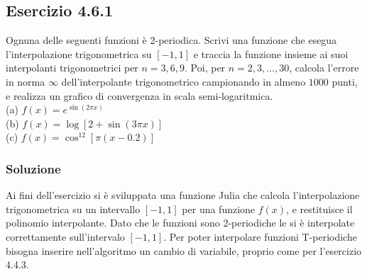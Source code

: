 \documentclass[letterpaper, 12pt]{article}
\begin{document}
\subsection{Esercizio 4.6.1} 
Ognuna delle seguenti funzioni è 2-periodica. Scrivi una funzione che esegua l'interpolazione trigonometrica 
su $[-1,1]$ e traccia la funzione insieme ai suoi interpolanti trigonometrici per $n=3,6,9$. 
Poi, per $n=2,3,\ldots,30$, calcola l'errore in norma $\infty$ dell'interpolante trigonometrico campionando 
in almeno $1000$ punti, e realizza un grafico di convergenza in scala semi-logaritmica. \\
(a) $f(x) = e^{\sin (2\pi x)}\qquad$ \\
(b) $f(x) = \log [2+ \sin (3 \pi x ) ]\qquad$ \\
(c) $f(x) = \cos^{12}[\pi (x-0.2)]$ \\

\subsubsection{Soluzione}
Ai fini dell'esercizio si è sviluppata una funzione Julia che calcola l'interpolazione trigonometrica
su un intervallo $[-1, 1]$ per una funzione $f(x)$, e restituisce il polinomio interpolante. Dato che le funzioni
sono 2-periodiche le si è interpolate correttamente sull'intervalo $[-1, 1]$. Per poter interpolare funzioni 
T-periodiche bisogna inserire nell'algoritmo un cambio di variabile, proprio come per l'esercizio 4.4.3.
\end{document}

